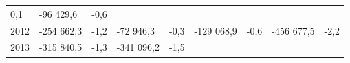 \begin{longtable}[]{@{}lllllllll@{}}
\begin{minipage}[t]{0.06\columnwidth}
0,1\strut
\end{minipage} & \begin{minipage}[t]{0.10\columnwidth}\raggedright
-96 429,6\strut
\end{minipage} & \begin{minipage}[t]{0.06\columnwidth}\raggedright
-0,6\strut
\end{minipage}\tabularnewline
\begin{minipage}[t]{0.05\columnwidth}\raggedright
2012\strut
\end{minipage} & \begin{minipage}[t]{0.10\columnwidth}\raggedright
-254 662,3\strut
\end{minipage} & \begin{minipage}[t]{0.06\columnwidth}\raggedright
-1,2\strut
\end{minipage} & \begin{minipage}[t]{0.16\columnwidth}\raggedright
-72 946,3\strut
\end{minipage} & \begin{minipage}[t]{0.06\columnwidth}\raggedright
-0,3\strut
\end{minipage} & \begin{minipage}[t]{0.12\columnwidth}\raggedright
-129 068,9\strut
\end{minipage} & \begin{minipage}[t]{0.06\columnwidth}\raggedright
-0,6\strut
\end{minipage} & \begin{minipage}[t]{0.10\columnwidth}\raggedright
-456 677,5\strut
\end{minipage} & \begin{minipage}[t]{0.06\columnwidth}\raggedright
-2,2\strut
\end{minipage}\tabularnewline
\begin{minipage}[t]{0.05\columnwidth}\raggedright
2013\strut
\end{minipage} & \begin{minipage}[t]{0.10\columnwidth}\raggedright
-315 840,5\strut
\end{minipage} & \begin{minipage}[t]{0.06\columnwidth}\raggedright
-1,3\strut
\end{minipage} & \begin{minipage}[t]{0.16\columnwidth}\raggedright
-341 096,2\strut
\end{minipage} & \begin{minipage}[t]{0.06\columnwidth}\raggedright
-1,5\strut

\end{minipage}
\end{longtable}
